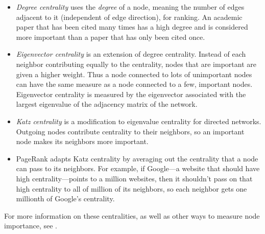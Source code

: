 \begin{itemize}
\item \emph{Degree centrality} uses the \emph{degree} of a node, meaning the number of edges adjacent to it (independent of edge direction), for ranking.
An academic paper that has been cited many times has a high degree and is considered more important than a paper that has only been cited once.
\item \emph{Eigenvector centrality} is an extension of degree centrality.
Instead of each neighbor contributing equally to the centrality, nodes that are important are given a higher weight.
Thus a node connected to lots of unimportant nodes can have the same measure as a node connected to a few, important nodes.
Eigenvector centrality is measured by the eigenvector associated with the largest eigenvalue of the adjacency matrix of the network.
\item \emph{Katz centrality} is a modification to eigenvalue centrality for directed networks.
Outgoing nodes contribute centrality to their neighbors, so an important node makes its neighbors more important.
\item PageRank adapts Katz centrality by averaging out the centrality that a node can pass to its neighbors.
For example, if Google---a website that should have high centrality---points to a million websites, then it shouldn't pass on that high centrality to all of million of its neighbors, so each neighbor gets one millionth of Google's centrality.
\end{itemize}

For more information on these centralities, as well as other ways to measure node importance, see \cite{newman2010networks}.
